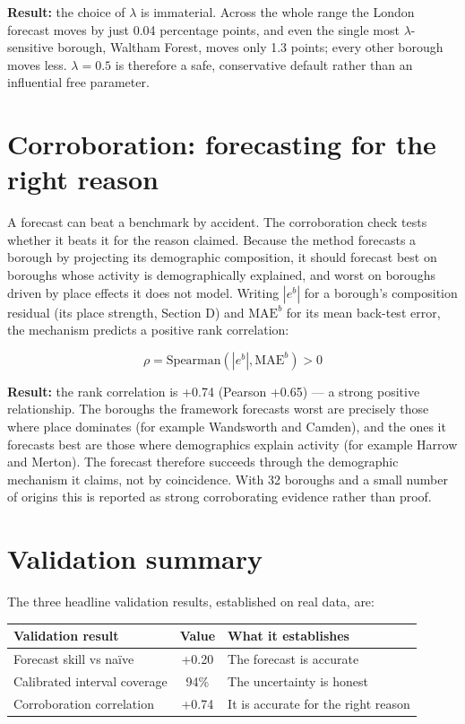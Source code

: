 \documentclass[ %
                    author={Ashrey Ashrey, Sanya Kapoor, Trisha Sharma, Yash Bhooshan Pandloskar},
                supervisor={Dr. Dalila O’Grady},
                    degree={MSc},
                     title={Using machine learning to forecast physical activity participation, volunteering and activity patterns in London},
                  subtitle={},
                      type={},
                      year={2021}]{dissertation}
\begin{document}
\noindent
\textbf{Result:} the choice of \(\lambda\) is immaterial. Across the whole range the London forecast moves by just 0.04 percentage points, and even the single most \(\lambda\)-sensitive borough, Waltham Forest, moves only 1.3 points; every other borough moves less. \(\lambda=0.5\) is therefore a safe, conservative default rather than an influential free parameter.

\section{Corroboration: forecasting for the right reason}

\noindent
A forecast can beat a benchmark by accident. The corroboration check tests whether it beats it for the reason claimed. Because the method forecasts a borough by projecting its demographic composition, it should forecast best on boroughs whose activity is demographically explained, and worst on boroughs driven by place effects it does not model. Writing \(|e^b|\) for a borough's composition residual (its place strength, Section D) and \(\mathrm{MAE}^b\) for its mean back-test error, the mechanism predicts a positive rank correlation:

\[
\rho
=
\mathrm{Spearman}
\left(
|e^b|,
\mathrm{MAE}^b
\right)
>
0
\]

\noindent
\textbf{Result:} the rank correlation is +0.74 (Pearson +0.65) --- a strong positive relationship. The boroughs the framework forecasts worst are precisely those where place dominates (for example Wandsworth and Camden), and the ones it forecasts best are those where demographics explain activity (for example Harrow and Merton). The forecast therefore succeeds through the demographic mechanism it claims, not by coincidence. With 32 boroughs and a small number of origins this is reported as strong corroborating evidence rather than proof.

\section{Validation summary}

\noindent
The three headline validation results, established on real data, are:

\begin{table}[!htb]
\centering
\begin{tabular}{lcl}
\toprule
\textbf{Validation result} & \textbf{Value} & \textbf{What it establishes} \\
\midrule
Forecast skill vs naïve & +0.20 & The forecast is accurate \\
Calibrated interval coverage & 94\% & The uncertainty is honest \\
Corroboration correlation & +0.74 & It is accurate for the right reason \\
\bottomrule
\end{tabular}
\end{table}
\end{document}
